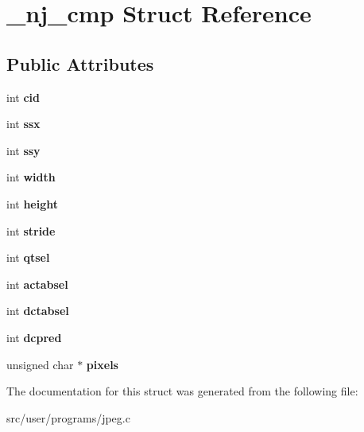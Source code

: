 \hypertarget{struct__nj__cmp}{}\section{\+\_\+nj\+\_\+cmp Struct Reference}
\label{struct__nj__cmp}
\subsection*{Public Attributes}
\begin{DoxyCompactItemize}
\item 
\mbox{\label{struct__nj__cmp_ac13787d29bef52d549fbe3708aebe16b}} 
int {\bfseries cid}
\item 
\mbox{\label{struct__nj__cmp_afd22b605e58d3d30bb512fd373b671b5}} 
int {\bfseries ssx}
\item 
\mbox{\label{struct__nj__cmp_a4a39414f1687167abdccfdb981569122}} 
int {\bfseries ssy}
\item 
\mbox{\label{struct__nj__cmp_a183e3268791225f6790a2d89a43ea289}} 
int {\bfseries width}
\item 
\mbox{\label{struct__nj__cmp_a9f2b0df2ac62b59600d7a62e33d10314}} 
int {\bfseries height}
\item 
\mbox{\label{struct__nj__cmp_a2afad52a0d6acb8f91c4b011d4c38827}} 
int {\bfseries stride}
\item 
\mbox{\label{struct__nj__cmp_a5c567ceae5481c68d6748f4c7fc10b98}} 
int {\bfseries qtsel}
\item 
\mbox{\label{struct__nj__cmp_a6704c5623b02d9bb51b13d67c04ffa64}} 
int {\bfseries actabsel}
\item 
\mbox{\label{struct__nj__cmp_a96d4fa70dc97347273da0a58533e398d}} 
int {\bfseries dctabsel}
\item 
\mbox{\label{struct__nj__cmp_a8453056aba1997ee16e484e405705611}} 
int {\bfseries dcpred}
\item 
\mbox{\label{struct__nj__cmp_ab8a6b2b46f668f5d98b303b0af1e68c8}} 
unsigned char $\ast$ {\bfseries pixels}
\end{DoxyCompactItemize}


The documentation for this struct was generated from the following file\+:\begin{DoxyCompactItemize}
\item 
src/user/programs/jpeg.\+c\end{DoxyCompactItemize}
